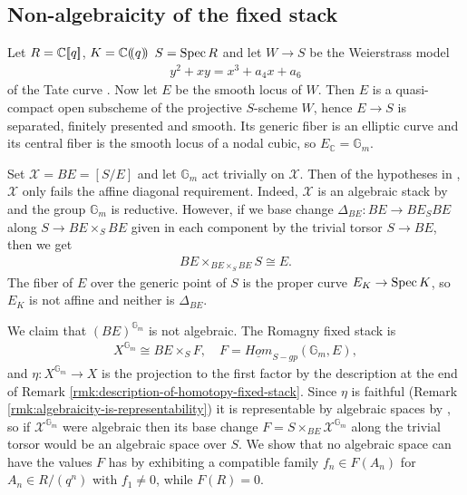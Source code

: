 \documentclass[12pt,dvipsnames]{amsart}
\begin{document}
\subsection{Non-algebraicity of the fixed stack}\label{rl-000H}\label{sec:non-algebraicity-of-the-fixed-stack}

\begin{example}\label{rl-000I}\label{example:affine-diagonal-is-necessary}
  Let \(R = \mathbb C[\hspace{-2pt}[q]\hspace{-2pt}]\), $K = \mathbb C(\hspace{-2pt}(q)\hspace{-2pt})$ \(S = \operatorname{Spec} R\) and let \(W \to S\) be the Weierstrass model
  \begin{align*}
    y^2 + xy = x^3 + a_4x + a_6
  \end{align*}
  of the Tate curve \cite{silverman_AdvancedTopicsArithmetic1999}. Now let \(E\) be the smooth locus of \(W\). Then \(E\) is a quasi-compact open subscheme of the projective \(S\)-scheme \(W\), hence \(E\to S\) is separated, finitely presented and smooth. Its generic fiber is an elliptic curve and its central fiber is the smooth locus of a nodal cubic, so \(E_{\mathbb C} = \mathbb G_m\).

  Set \(\mathcal X = BE = [S/E]\) and let \(\mathbb G_m\) act trivially on \(\mathcal X\). Then of the hypotheses in \cite[Theorem 1.2.1]{romagny_AlgebraicitySmoothnessFixed2022}, \(\mathcal X\) only fails the affine diagonal requirement. Indeed, \(\mathcal X\) is an algebraic stack by \cite[06PL]{stacks-project} and the group \(\mathbb G_m\) is reductive. However, if we base change \(\Delta_{BE}:BE\to BE_SBE\) along \(S\to BE\times_SBE\) given in each component by the trivial torsor \(S\to BE\), then we get
  \begin{align*}
    BE\times_{BE\times_SBE} S \cong E.
  \end{align*}
  The fiber of $E$ over the generic point of \(S\) is the proper curve \(E_K\to \operatorname{Spec} K\), so \(E_K\) is not affine and neither is \(\Delta_{BE}\).
  
  We claim that \((BE)^{\mathbb G_m}\) is not algebraic. The Romagny fixed stack is
  \begin{align*}
    X^{\mathbb G_m} \cong BE\times_S F, \hspace{1em} F = \underline{Hom}_{S-gp}(\mathbb G_m, E),
  \end{align*}
  and \(\eta:X^{\mathbb G_m}\to X\) is the projection to the first factor by the description at the end of Remark \ref{rmk:description-of-homotopy-fixed-stack}. Since \(\eta\) is faithful (Remark \ref{rmk:algebraicity-is-representability}) it is representable by algebraic spaces by \cite[\href{https://stacks.math.columbia.edu/tag/04Y5}{Tag 04Y5}]{stacks-project}, so if \(\mathcal X^{\mathbb G_m}\) were algebraic then its base change \(F = S\times_{BE}\mathcal X^{\mathbb G_m}\) along the trivial torsor would be an algebraic space over \(S\). We show that no algebraic space can have the values \(F\) has by exhibiting a compatible family \(f_n \in F(A_n)\) for \(A_n \in R/(q^n)\) with \(f_1 \neq 0\), while \(F(R) = 0\).
  

\end{example}
\end{document}
